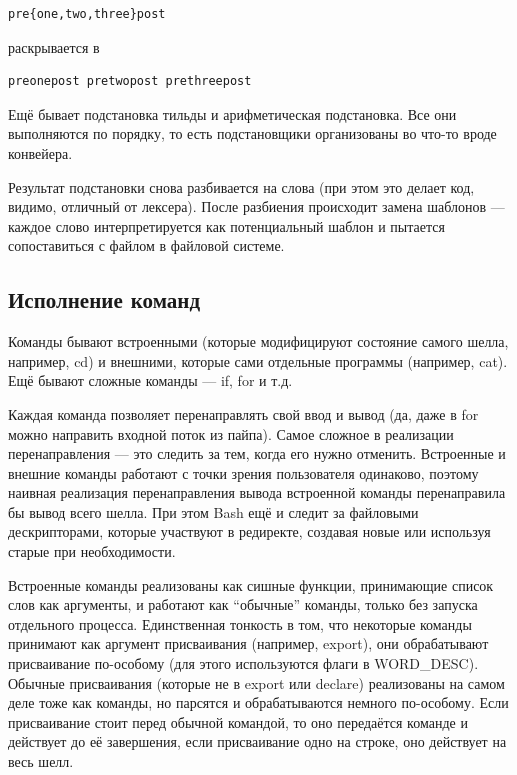 \documentclass[a5paper]{article}
\begin{document}
\begin{verbatim}
pre{one,two,three}post
\end{verbatim}

раскрывается в 

\begin{verbatim}
preonepost pretwopost prethreepost
\end{verbatim}

Ещё бывает подстановка тильды и арифметическая подстановка. Все они выполняются по порядку, то есть подстановщики организованы во что-то вроде конвейера.

Результат подстановки снова разбивается на слова (при этом это делает код, видимо, отличный от лексера). После разбиения происходит замена шаблонов --- каждое слово интерпретируется как потенциальный шаблон и пытается сопоставиться с файлом в файловой системе.

\subsection{Исполнение команд}

Команды бывают встроенными (которые модифицируют состояние самого шелла, например, cd) и внешними, которые сами отдельные программы (например, cat). Ещё бывают сложные команды --- if, for и т.д.

Каждая команда позволяет перенаправлять свой ввод и вывод (да, даже в for можно направить входной поток из пайпа). Самое сложное в реализации перенаправления --- это следить за тем, когда его нужно отменить. Встроенные и внешние команды работают с точки зрения пользователя одинаково, поэтому наивная реализация перенаправления вывода встроенной команды перенаправила бы вывод всего шелла. При этом Bash ещё и следит за файловыми дескрипторами, которые участвуют в редиректе, создавая новые или используя старые при необходимости.

Встроенные команды реализованы как сишные функции, принимающие список слов как аргументы, и работают как ``обычные'' команды, только без запуска отдельного процесса. Единственная тонкость в том, что некоторые команды принимают как аргумент присваивания (например, export), они обрабатывают присваивание по-особому (для этого используются флаги в WORD\_DESC). Обычные присваивания (которые не в export или declare) реализованы на самом деле тоже как команды, но парсятся и обрабатываются немного по-особому. Если присваивание стоит перед обычной командой, то оно передаётся команде и действует до её завершения, если присваивание одно на строке, оно действует на весь шелл. 
\end{document}
